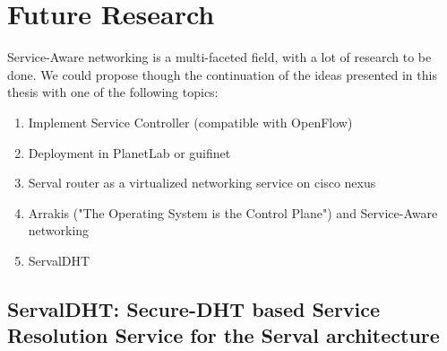 \newpage
\section{Future Research}
Service-Aware networking is a multi-faceted field, with a lot of research to be done.
We could propose though the continuation of the ideas presented in this thesis with one of the following topics:
\begin{enumerate}
  \item Implement Service Controller (compatible with OpenFlow)
  \item Deployment in PlanetLab or guifinet
  \item Serval router as a virtualized networking service on cisco nexus
  \item Arrakis ("The Operating System is the Control Plane") and Service-Aware networking
  \item ServalDHT
\end{enumerate}

\subsection{ServalDHT: Secure-DHT based Service Resolution Service for the Serval architecture}
